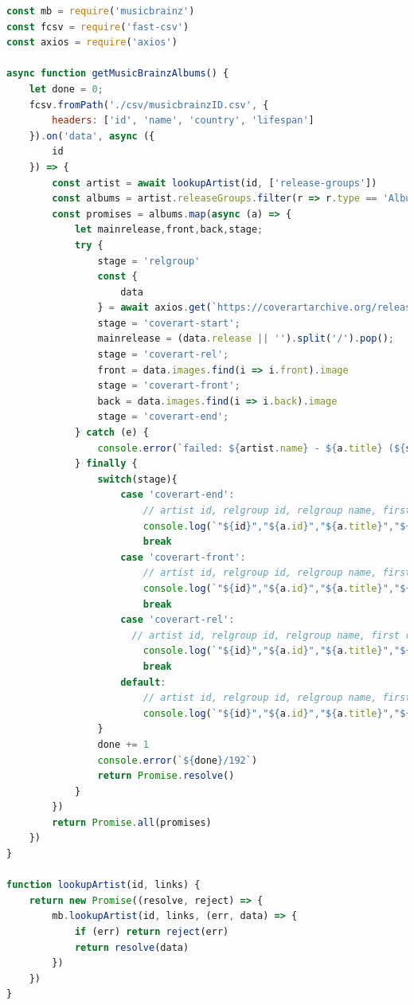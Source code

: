 \documentclass[10pt, a4paper]{article}
\begin{document}
\begin{lstlisting}[language=JavaScript, label=lst:releaseDownload, caption = Release fetching from Musicbrainz. Includes cover art url fetching ]
const mb = require('musicbrainz')
const fcsv = require('fast-csv')
const axios = require('axios')

async function getMusicBrainzAlbums() {
	let done = 0;
	fcsv.fromPath('./csv/musicbrainzID.csv', {
		headers: ['id', 'name', 'country', 'lifespan']
	}).on('data', async ({
		id
	}) => {
		const artist = await lookupArtist(id, ['release-groups'])
		const albums = artist.releaseGroups.filter(r => r.type == 'Album')
		const promises = albums.map(async (a) => {
			let mainrelease,front,back,stage;
			try {
				stage = 'relgroup'
				const {
					data
				} = await axios.get(`https://coverartarchive.org/release-group/${a.id}/`);
				stage = 'coverart-start';
				mainrelease = (data.release || '').split('/').pop();
				stage = 'coverart-rel';
				front = data.images.find(i => i.front).image
				stage = 'coverart-front';
				back = data.images.find(i => i.back).image
				stage = 'coverart-end';
			} catch (e) {
				console.error(`failed: ${artist.name} - ${a.title} (${stage}) => ${a.id}`)
			} finally {
				switch(stage){
					case 'coverart-end':
						// artist id, relgroup id, relgroup name, first release date, main release, front cover, back cover
						console.log(`"${id}","${a.id}","${a.title}","${a.firstReleaseDate || ''}","${mainrelease}","${front || ''}","${back || ''}"`)
						break
					case 'coverart-front':
						// artist id, relgroup id, relgroup name, first release date, main release, front cover
						console.log(`"${id}","${a.id}","${a.title}","${a.firstReleaseDate || ''}","${mainrelease}","${front || ''}",""`)
						break
					case 'coverart-rel':
					  // artist id, relgroup id, relgroup name, first release date, main release
						console.log(`"${id}","${a.id}","${a.title}","${a.firstReleaseDate || ''}","${mainrelease}","",""`)
						break
					default:
						// artist id, relgroup id, relgroup name, first release date
						console.log(`"${id}","${a.id}","${a.title}","${a.firstReleaseDate || ''}","","",""`)
				}
				done += 1
				console.error(`${done}/192`)
				return Promise.resolve()
			}
		})
		return Promise.all(promises)
	})
}

function lookupArtist(id, links) {
	return new Promise((resolve, reject) => {
		mb.lookupArtist(id, links, (err, data) => {
			if (err) return reject(err)
			return resolve(data)
		})
	})
}
\end{lstlisting}
\end{document}
